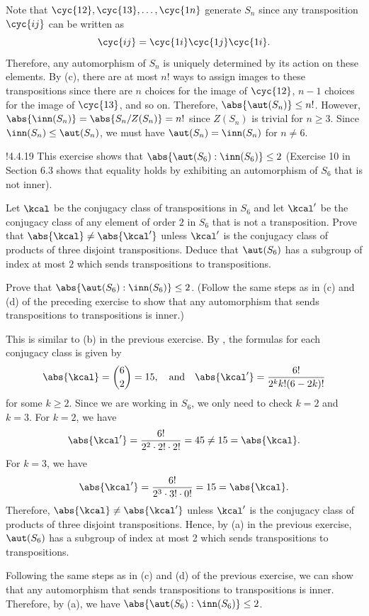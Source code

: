 \begin{solenum}
	\item Note that $\cyc{1 2}, \cyc{1 3}, \ldots, \cyc{1 n}$ generate $S_n$ since any transposition $\cyc{i j}$ can be written as
	\[
		\cyc{i j} = \cyc{1 i}\cyc{1 j}\cyc{1 i}.
	\]
	Therefore, any automorphism of $S_n$ is uniquely determined by its action on these elements.
	By (c), there are at most $n!$ ways to assign images to these transpositions since there are $n$ choices for the image of $\cyc{1 2}$, $n - 1$ choices for the image of $\cyc{1 3}$, and so on.
	Therefore, $\abs{\aut(S_n)} \leq n!$.
	However, $\abs{\inn(S_n)} = \abs{S_n/Z(S_n)} = n!$ since $Z(S_n)$ is trivial for $n \geq 3$.
	Since $\inn(S_n) \leq \aut(S_n)$, we must have $\aut(S_n) = \inn(S_n)$ for $n \neq 6$.
\end{solenum}

\begin{exercise}!{4.4.19}
	This exercise shows that $\abs{\aut(S_6):\inn(S_6)}\leq 2$ (Exercise 10 in Section 6.3 shows that equality holds by exhibiting an automorphism of $S_6$ that is not inner).
	\begin{subexercises}
		\item Let $\kcal$ be the conjugacy class of transpositions in $S_6$ and let $\kcal'$ be the conjugacy class of any element of order $2$ in $S_6$ that is not a transposition.
		Prove that $\abs{\kcal}\neq\abs{\kcal'}$ unless $\kcal'$ is the conjugacy class of products of three disjoint transpositions.
		Deduce that $\aut(S_6)$ has a subgroup of index at most $2$ which sends transpositions to transpositions.
		\item Prove that $\abs{\aut(S_6):\inn(S_6)}\leq 2$. (Follow the same steps as in (c) and (d) of the preceding exercise to show that any automorphism that sends transpositions to transpositions is inner.)
	\end{subexercises}
\end{exercise}

\begin{solenum}
	\item This is similar to (b) in the previous exercise.
	By , the formulas for each conjugacy class is given by
	\[
		\abs{\kcal} = \binom 62 = 15, \quad \text{and} \quad \abs{\kcal'} = \frac{6!}{2^k k! (6 - 2k)!}
	\]
	for some $k \geq 2$.
	Since we are working in $S_6$, we only need to check $k = 2$ and $k = 3$.
	For $k = 2$, we have
	\[
		\abs{\kcal'} = \frac{6!}{2^2 \cdot 2! \cdot 2!} = 45 \neq 15 = \abs{\kcal}.
	\]
	For $k = 3$, we have
	\[
		\abs{\kcal'} = \frac{6!}{2^3 \cdot 3! \cdot 0!} = 15 = \abs{\kcal}.
	\]
	Therefore, $\abs{\kcal} \neq \abs{\kcal'}$ unless $\kcal'$ is the conjugacy class of products of three disjoint transpositions.
	Hence, by (a) in the previous exercise, $\aut(S_6)$ has a subgroup of index at most 2 which sends transpositions to transpositions.
	\item Following the same steps as in (c) and (d) of the previous exercise, we can show that any automorphism that sends transpositions to transpositions is inner.
	Therefore, by (a), we have $\abs{\aut(S_6) : \inn(S_6)} \leq 2$.
\end{solenum}

